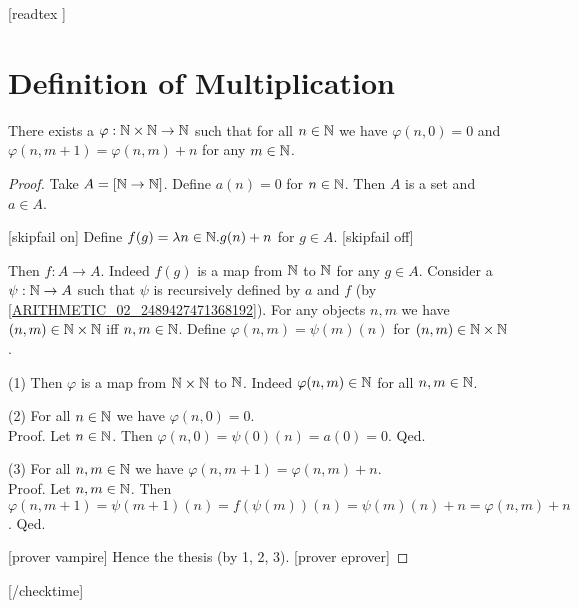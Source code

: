 \documentclass[10pt]{article}
\begin{document}
  \begin{imports}
    \begin{forthel}
      [readtex ]
    \end{forthel}
  \end{imports}


  \section{Definition of Multiplication}

  \begin{forthel}
    [checktime 3]
    \begin{lemma}
      There exists a $\varphi : \mathbb{N} \times \mathbb{N} \to \mathbb{N}$ such
      that for all $n \in \mathbb{N}$ we have $\varphi(n, 0) = 0$ and
      $\varphi(n, m + 1) = \varphi(n,m) + n$ for any $m \in \mathbb{N}$.
    \end{lemma}
    \begin{proof}
      Take $A = [\mathbb{N} \to \mathbb{N}]$.
      Define $a(n) = 0$ for $n \in \mathbb{N}$.
      Then $A$ is a set and $a \in A$.

      [skipfail on] %
      Define $f(g) = \mathrm{\lambda} n \in \mathbb{N}. g(n) + n$ for $g \in A$.
      [skipfail off]

      Then $f : A \to A$.
      Indeed $f(g)$ is a map from $\mathbb{N}$ to $\mathbb{N}$ for any $g \in A$.
      Consider a $\psi : \mathbb{N} \to A$ such that $\psi$ is recursively defined by
      $a$ and $f$ (by \cref{ARITHMETIC_02_2489427471368192}).
      For any objects $n, m$ we have $(n,m) \in \mathbb{N} \times \mathbb{N}$ iff
      $n, m \in \mathbb{N}$.
      Define $\varphi(n,m) = \psi(m)(n)$ for $(n,m) \in \mathbb{N} \times \mathbb{N}$.
      
      (1) Then $\varphi$ is a map from $\mathbb{N} \times \mathbb{N}$ to $\mathbb{N}$.
      Indeed $\varphi(n,m) \in \mathbb{N}$ for all $n, m \in \mathbb{N}$.

      (2) For all $n \in \mathbb{N}$ we have $\varphi(n,0) = 0$. \\
      Proof.
        Let $n \in \mathbb{N}$.
        Then $\varphi(n,0)
          = \psi(0)(n)
          = a(0)
          = 0$.
      Qed.

      (3) For all $n, m \in \mathbb{N}$ we have $\varphi(n, m + 1) =
      \varphi(n,m) + n$. \\
      Proof.
        Let $n, m \in \mathbb{N}$.
        Then $\varphi(n, m + 1)
          = \psi(m + 1)(n)
          = f(\psi(m))(n)
          = \psi(m)(n) + n
          = \varphi(n,m) + n$.
      Qed.

      [prover vampire]
      Hence the thesis (by 1, 2, 3).
      [prover eprover]
    \end{proof}
    [/checktime]
  \end{forthel}
\end{document}
